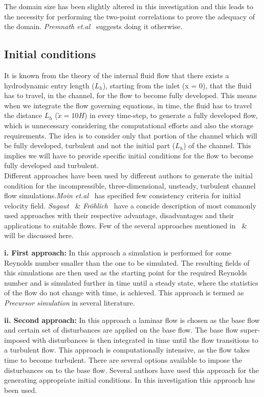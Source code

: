 %
The domain size has been slightly altered in this investigation and this leads to the necessity for performing the two-point correlations to prove the adequacy of the domain. \emph{Premnath et.al}~\cite{Premnath:09} suggests doing it otherwise.
%
%
\subsection{Initial conditions}
It is known from the theory of the internal fluid flow that there exists a hydrodynamic entry length ($L_h$), starting from the inlet (x = 0), that the fluid has to travel, in the channel, for the flow to become fully developed. This means when we integrate the flow governing equations, in time, the fluid has to travel the distance $L_h$ ($\tilde{x} =10H$) in every time-step, to generate a fully developed flow, which is unnecessary considering the computational efforts and also the storage requirements. The idea is to consider only that portion of the channel which will be fully developed, turbulent and not the initial part ($L_h$) of the channel. This implies we will have to provide specific initial conditions for the flow to become fully developed and turbulent.\\
%
Different approaches have been used by different authors to generate the initial condition for the incompressible, three-dimensional, unsteady, turbulent channel flow simulations.\emph{Moin et.al}~\cite{Moin:78} has specified few consistency criteria for initial velocity field. \emph{Sagaut}~\cite{sagaut:02} \& \emph{Fröhlich}~\cite{froehlich:book} have a concide description of most commonly used approaches with their respective advantage, disadvantages and their applications to suitable flows. Few of the several approaches mentioned in~\cite{sagaut:02} \& ~\cite{froehlich:book} will be discussed here.

\textbf{i. First approach:} In this approach a simulation is performed for some Reynolds number smaller than the one to be simulated. The resulting fields of this simulations are then used as the starting point for the required Reynolds number and is  simulated further in time until a steady state, where the statistics of the flow do not change with time, is achieved. This approach is termed as \emph{Precursor simulation} in several literature.

\textbf{ii. Second approach: } In this approach a laminar flow is chosen as the base flow and certain set of disturbances are applied on the base flow. The base flow super-imposed with disturbances is then integrated in time until the flow transitions to a turbulent flow. This approach is computationally intensive, as the flow takes time to become turbulent. There are several options available to impose the disturbances on to the base flow. Several authors have used this approach for the generating appropriate initial conditions. In this investigation this approach has been used.\\

